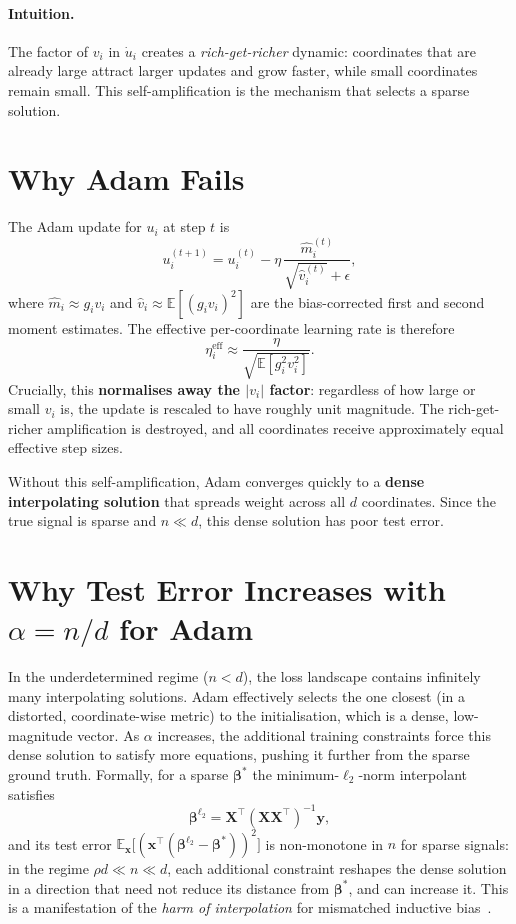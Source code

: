 \documentclass[11pt]{article}
\newcommand{\E}{\mathbb{E}}
\begin{document}
\paragraph{Intuition.}  The factor of $v_i$ in $\dot{u}_i$ creates a
\emph{rich-get-richer} dynamic: coordinates that are already large attract
larger updates and grow faster, while small coordinates remain small.  This
self-amplification is the mechanism that selects a sparse solution.

\section{Why Adam Fails}

The Adam update for $u_i$ at step $t$ is
\[
    u_i^{(t+1)} = u_i^{(t)} - \eta \,\frac{\hat{m}_i^{(t)}}{\sqrt{\hat{v}_i^{(t)}} + \epsilon},
\]
where $\hat{m}_i \approx g_i v_i$ and $\hat{v}_i \approx \E[(g_i v_i)^2]$ are the
bias-corrected first and second moment estimates.  The effective per-coordinate
learning rate is therefore
\[
    \eta_i^{\text{eff}} \approx \frac{\eta}{\sqrt{\E[g_i^2 v_i^2]}}.
\]
Crucially, this \textbf{normalises away the $|v_i|$ factor}: regardless of how
large or small $v_i$ is, the update is rescaled to have roughly unit magnitude.
The rich-get-richer amplification is destroyed, and all coordinates receive
approximately equal effective step sizes.

Without this self-amplification, Adam converges quickly to a \textbf{dense
interpolating solution} that spreads weight across all $d$ coordinates.  Since
the true signal is sparse and $n \ll d$, this dense solution has poor test
error.

\section{Why Test Error Increases with $\alpha = n/d$ for Adam}

In the underdetermined regime ($n < d$), the loss landscape contains infinitely
many interpolating solutions.  Adam effectively selects the one closest (in a
distorted, coordinate-wise metric) to the initialisation, which is a dense,
low-magnitude vector.  As $\alpha$ increases, the additional training
constraints force this dense solution to satisfy more equations, pushing it
further from the sparse ground truth.  Formally, for a sparse $\boldsymbol{\beta}^*$
the minimum-$\ell_2$-norm interpolant satisfies
\[
    \boldsymbol{\beta}^{\ell_2} = \mathbf{X}^\top (\mathbf{X}\mathbf{X}^\top)^{-1} \mathbf{y},
\]
and its test error $\E_{\mathbf{x}}\bigl[(\mathbf{x}^\top(\boldsymbol{\beta}^{\ell_2} -
\boldsymbol{\beta}^*))^2\bigr]$ is non-monotone in $n$ for sparse signals: in the
regime $\rho d \ll n \ll d$, each additional constraint reshapes the dense
solution in a direction that need not reduce its distance from $\boldsymbol{\beta}^*$,
and can increase it.  This is a manifestation of the \emph{harm of
interpolation} for mismatched inductive bias~\cite{koehler2021uniform}.
\end{document}
